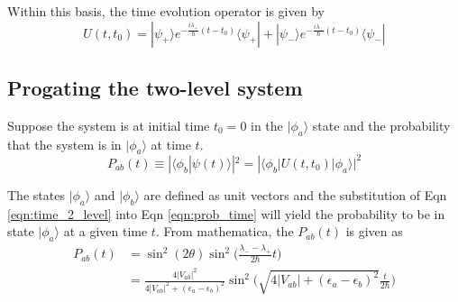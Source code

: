 \documentclass{article}
\begin{document}
Within this basis, the time evolution operator is given by
\begin{equation}
  U(t,t_0) = |\psi_+\rangle e^{-\frac{i\lambda_+}{\hbar}(t-t_0)}\langle\psi_+|
  + |\psi_-\rangle e^{-\frac{i\lambda_-}{\hbar}(t-t_0)}\langle\psi_-|
  \label{eqn:time_2_level}
\end{equation}

\subsection{Progating the two-level system}

Suppose the system is at initial time $t_0=0$ in the $|\phi_a\rangle$ state
and the probability that the system is in $|\phi_a\rangle$ at time $t$.
\begin{equation}
  P_{ab}(t)\equiv |\langle\phi_b|\psi(t)\rangle|^2 = |\langle\phi_b|U(t,t_0)|\phi_a\rangle|^2
  \label{eqn:prob_time}
\end{equation}

The states $|\phi_a\rangle$ and $|\phi_b\rangle$ are defined as unit
vectors and the substitution of Eqn \eqref{eqn:time_2_level} into Eqn \eqref{eqn:prob_time}
will yield the probability to be in state $|\phi_a\rangle$ at a given time $t$.
From mathematica, the $P_{ab}(t)$ is given as
\begin{align}
  P_{ab}(t)&= \sin^2(2\theta)\sin^2\Bigg(\frac{\lambda_- - \lambda_+}{2\hbar}t\Bigg)
  \label{eqn:trig_identity}\\
  &=\frac{4|V_{ab}|^2}{4|V_{ab}|^2+(\epsilon_a-\epsilon_b)^2}
  \sin^2\Bigg(\sqrt{4|V_{ab}|+(\epsilon_a-\epsilon_b)^2}\frac{t}{2\hbar}\Bigg)
  \label{eqn:prob_final}
\end{align}
\end{document}
